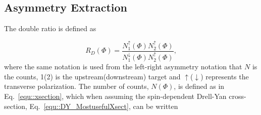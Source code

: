 \subsection{Asymmetry Extraction}
The double ratio is defined as

\begin{equation}
  R_D(\Phi) =
  \frac{N_1^{\uparrow}(\Phi)N_2^{\uparrow}(\Phi)}
       {N_1^{\downarrow}(\Phi)N_2^{\uparrow}(\Phi)},
\end{equation}
\noindent
where the same notation is used from the left-right asymmetry notation that $N$
is the counts, 1(2) is the upstream(downstream) target and
$\uparrow$($\downarrow$) represents the transverse polarization.  The number of
counts, $N(\Phi)$, is defined as in Eq.~\ref{equ::xsection}, which when
assuming the spin-dependent Drell-Yan cross-section,
Eq.~\ref{equ::DY_MostusefulXsect}, can be written

